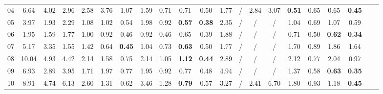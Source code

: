 \documentclass[sigconf]{acmart}
\begin{document}
\begin{table}
{\begin{tabular}{|c|cccccccccccccccccc|cc|}
04                    & 6.64          & 4.02          & 2.96          & 2.58          & 3.76    & 1.07           & 1.59       & 0.71       & 0.71          & {\color[HTML]{3531FF} 0.50}          & 1.77           & /              & 2.84         & 3.07         & \textbf{0.51}   & 0.65     &  {\color[HTML]{3531FF} 0.65}                        & \textbf{0.45}               \\
05                    & 3.97          & 1.93          & 2.29          & 1.08          & {\color[HTML]{3531FF} 1.02}    & {\color[HTML]{3531FF} 0.54}            & 1.98       & 0.92       & \textbf{0.57} & \textbf{0.38} & 2.35           & /              & /            & /            &   1.04           & 0.69     & 1.07                        & 0.59 \\
06                    & 1.95          & 1.59          & 1.77          & 1.00          & 0.92    & 0.46           & 0.92       & 0.46       & {\color[HTML]{3531FF} 0.65}          & {\color[HTML]{3531FF} 0.39}          & 1.88           & /              & /            & /            & 0.71            & 0.50     & \textbf{0.62}               & \textbf{0.34}               \\
07                    & 5.17          & 3.35          & 1.55          & 1.42          &  {\color[HTML]{3531FF} 0.64}    & \textbf{0.45}  & 1.04       & 0.73       & \textbf{0.63} & {\color[HTML]{3531FF} 0.50}          & 1.77           & /              & /            & /            & 1.70            & 0.89     & 1.86                        & 1.64                        \\
08                    & 10.04         & 4.93          & 4.42          & 2.14          &  {\color[HTML]{3531FF} 1.58}    & {\color[HTML]{3531FF} 0.75}           & 2.14       & 1.05       & \textbf{1.12} & \textbf{0.44} & 2.89           & /              & /            & /            & 2.12            & 0.77     & 2.04 & 0.97                        \\
09                    & 6.93          & 2.89          & 3.95          & 1.71          & 1.97    & 0.77           & 1.95       & 0.92       & {\color[HTML]{3531FF} 0.77}          & {\color[HTML]{3531FF} 0.48}          & 4.94           & /              & /            & /            & 1.37            & 0.58     & \textbf{0.63}               & \textbf{0.35}               \\
10                    & 8.91          & 4.74          & 6.13          & 2.60          & 1.31    & 0.62           & 3.46       & 1.28       & \textbf{0.79} & {\color[HTML]{3531FF} 0.57}          & 3.27           & /              & 2.41         & 6.70         & 1.80            & 0.93     & {\color[HTML]{3166FF} 1.18} & \textbf{0.45}               \\ \hline

\end{tabular}}
\end{table}
\end{document}
